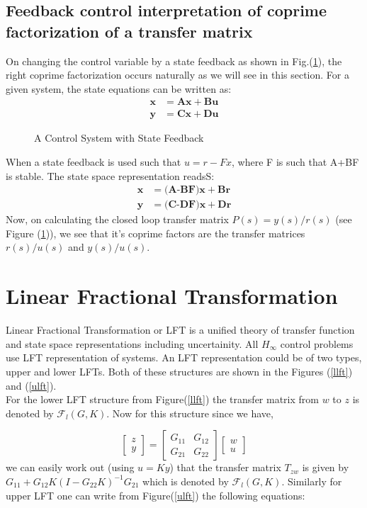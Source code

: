 \documentclass[a4paper,12pt]{article}
\begin{document}
		\subsection{Feedback control interpretation of coprime factorization of a transfer matrix}On changing the control variable by a state feedback as shown in Fig.(\ref{sf}), the right coprime factorization occurs naturally as we will see in this section. For a given system, the state equations can be written as:
		\begin{align}
		\textbf{\.x}&=\textbf{Ax} + \textbf{Bu}\\
		\textbf{y}&=\textbf{Cx} + \textbf{Du}
		\end{align}
		\begin{figure}[H]
 
			  \centering
			  
%			  
			  \def\svgscale{1.8}
			  \tiny{
			  
			  }
			  \caption{A Control System with State Feedback}
			 \label{sf}
		\end{figure}
		When a state feedback is used such that $u=r-Fx$, where F is such that A+BF is stable. The state space representation readsS:
		\begin{align}
		\textbf{\.x}&=\textbf{(A-BF)x} + \textbf{Br}\\
		\textbf{y}&=\textbf{(C-DF)x} + \textbf{Dr}
		\end{align}		
		Now, on calculating the closed loop transfer matrix $P(s)=y(s)/r(s)$ (see Figure (\ref{sf})), we see that it's coprime factors are the transfer matrices $r(s)/u(s)$ and $y(s)/u(s)$.
		\section{Linear Fractional Transformation} 
		Linear Fractional Transformation or LFT is a unified theory of transfer function and state space representations including uncertainity. All $H_{\infty}$ control problems use LFT representation of systems. An LFT representation could be of two types, upper and lower LFTs. Both of these structures are shown in the Figures (\ref{llft}) and (\ref{ulft}).
			\\
			For the lower LFT structure from Figure(\ref{llft}) the transfer matrix from $w$ to $z$ is denoted by $\mathscr{F}_{l}(G,K)$. Now for this structure since we have,
		
				\[
				\begin{bmatrix} 
				z\\
				y
				\end{bmatrix} = \begin{bmatrix} G_{11} & G_{12} \\ G_{21} & G_{22}\end{bmatrix} \begin{bmatrix} w \\ u\end{bmatrix}
				\]
			we can easily work out (using $u=Ky$) that the transfer matrix $T_{zw}$ is given by $G_{11}+G_{12}K(I-G_{22}K)^{-1}G_{21}$ which is denoted by $\mathscr{F}_{l}(G,K)$. Similarly for upper LFT one can write from Figure(\ref{ulft}) the following equations: 
			
\end{document}
